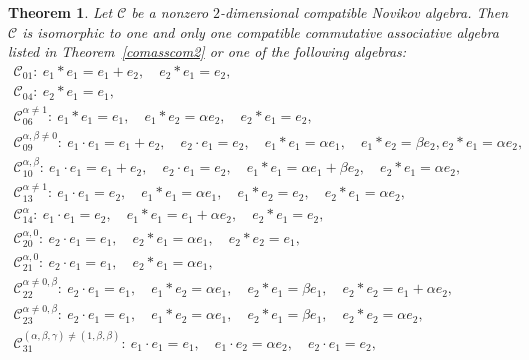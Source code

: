 \documentclass[pdftex]{sigma}
\numberwithin{equation}{section}
\newtheorem{Theorem}{Theorem}[section]
\begin{document}
\begin{Theorem}\label{comnov2}
Let $\mathcal{C}$ be a nonzero $2$-dimensional compatible Novikov algebra.
Then $\mathcal{C}$ is isomorphic to one and only one compatible commutative associative algebra listed in Theorem~{\rm\ref{comasscom2}} or one of the following algebras:
\begin{gather*}
 \mathcal{C}_{01} \colon\ e_{1} \ast e_{1} = e_{1} + e_{2},\quad e_{2} \ast e_{1} =e_{2}, \\
 \mathcal{C}_{04} \colon\ e_{2} \ast e_{1} =e_{1}, \\
 \mathcal{C}_{06}^{\alpha\neq 1} \colon\ e_{1} \ast e_{1} =e_{1}, \quad e_{1} \ast e_{2} = \alpha e_{2}, \quad e_{2} \ast e_{1} =e_{2}, \\
 \mathcal{C}_{09}^{\alpha ,\beta \neq 0} \colon\
 e_{1}\cdot e_{1}=e_{1}+e_{2} , \quad e_{2}\cdot e_{1}=e_{2} , \quad
 e_{1}\ast e_{1}=\alpha e_{1} , \quad e_{1}\ast e_{2}=\beta e_{2} , e_{2}\ast e_{1}=\alpha e_{2},
\\
 \mathcal{C}_{10}^{\alpha ,\beta } \colon\
 e_{1}\cdot e_{1}=e_{1}+e_{2} ,\quad e_{2}\cdot e_{1}=e_{2} , \quad
 e_{1}\ast e_{1}=\alpha e_{1}+\beta e_{2} , \quad e_{2}\ast e_{1}=\alpha e_{2},
\\
 \mathcal{C}_{13}^{\alpha\neq1 } \colon\
 e_{1}\cdot e_{1}=e_{2} , \quad
 e_{1}\ast e_{1}=\alpha e_{1} , \quad e_{1}\ast e_{2}=e_{2} , \quad e_{2}\ast
e_{1}=\alpha e_{2},
\\
 \mathcal{C}_{14}^{\alpha } \colon\
 e_{1}\cdot e_{1}=e_{2} , \quad
 e_{1}\ast e_{1}=e_{1}+\alpha e_{2} ,\quad e_{2}\ast e_{1}=e_{2},
\\
 \mathcal{C}_{20}^{\alpha ,0 } \colon\
 e_{2}\cdot e_{1}=e_{1} , \quad
 e_{2}\ast e_{1}=\alpha e_{1} , \quad e_{2}\ast e_{2}=e_{1},
\\
 \mathcal{C}_{21}^{\alpha ,0 } \colon\
 e_{2}\cdot e_{1}=e_{1} , \quad
 e_{2}\ast e_{1}=\alpha e_{1},
\\
 \mathcal{C}_{22}^{\alpha \neq 0,\beta } \colon\
 e_{2}\cdot e_{1}=e_{1} , \quad
 e_{1}\ast e_{2}=\alpha e_{1} , \quad e_{2}\ast e_{1}=\beta e_{1} , \quad
e_{2}\ast e_{2}=e_{1}+\alpha e_{2},
\\
 \mathcal{C}_{23}^{\alpha \neq 0,\beta } \colon\
 e_{2}\cdot e_{1}=e_{1} , \quad
 e_{1}\ast e_{2}=\alpha e_{1} , \quad e_{2}\ast e_{1}=\beta e_{1} ,\quad
e_{2}\ast e_{2}=\alpha e_{2},
\\
 \mathcal{C}_{31}^{(\alpha ,\beta ,\gamma) \neq (1,\beta,\beta) } \colon\
 e_{1}\cdot e_{1}=e_{1} , \quad e_{1}\cdot e_{2}=\alpha e_{2} , \quad e_{2}\cdot
e_{1}=e_{2} , \\

\end{gather*}
\end{Theorem}
\end{document}
